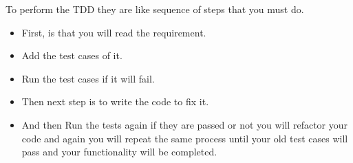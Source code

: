 To perform the TDD they are like sequence of steps that you must do.
\begin{itemize}
\item First, is that you will read the requirement.  
\item Add the test cases of it.  
\item Run the test cases if it will fail.  
\item Then next step is to write the code to fix it.  
\item And then Run the tests again if they are passed or not you will refactor your code and again you will repeat the same process until your old test cases will pass and your functionality will be completed.  
\end{itemize}




